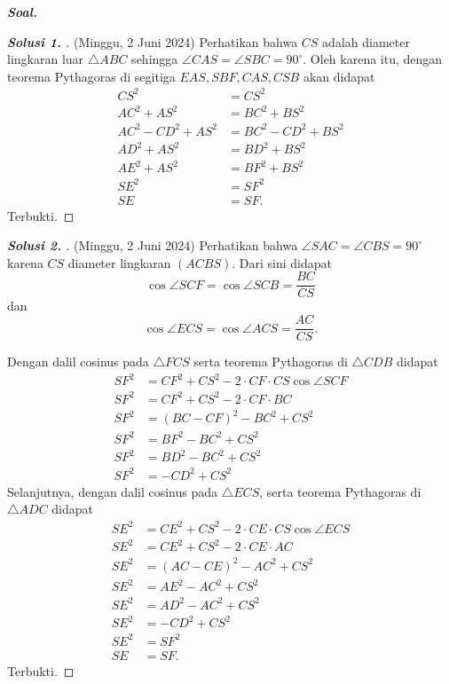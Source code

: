 \textbf{\textit{Soal. }} 
% 

\begin{proof}[\textbf{Solusi 1. }] (Minggu, 2 Juni 2024) 
Perhatikan bahwa $CS$ adalah diameter lingkaran luar $\triangle ABC$ sehingga $\angle CAS = \angle SBC = 90^\circ$. Oleh karena itu, dengan teorema Pythagoras di segitiga $EAS, SBF, CAS, CSB$ akan didapat
\begin{align*}
    CS^2 &= CS^2\\
    AC^2 + AS^2 &= BC^2+BS^2\\
    AC^2 - CD^2 + AS^2 &= BC^2 - CD^2 + BS^2\\
    AD^2 + AS^2 &= BD^2 + BS^2\\
    AE^2 + AS^2 &= BF^2 + BS^2\\
    SE^2 &= SF^2\\
    SE &= SF.
\end{align*}
Terbukti.
\end{proof}

\begin{proof}[\textbf{Solusi 2. }] (Minggu, 2 Juni 2024) 
Perhatikan bahwa $\angle SAC = \angle CBS = 90^\circ$ karena $CS$ diameter lingkaran $(ACBS)$. Dari sini didapat 
$$\cos \angle SCF = \cos \angle SCB = \frac{BC}{CS}$$ 
dan 
$$\cos \angle ECS = \cos \angle ACS = \frac{AC}{CS}.$$

Dengan dalil cosinus pada $\triangle FCS$ serta teorema Pythagoras di $\triangle CDB$ didapat
\begin{align*}
    SF^2 &= CF^2 + CS^2 - 2\cdot CF \cdot CS \cos \angle SCF\\
    SF^2 &= CF^2 + CS^2 - 2\cdot CF \cdot BC\\
    SF^2 &= (BC-CF)^2 - BC^2 + CS^2\\
    SF^2 &= BF^2 - BC^2 + CS^2\\
    SF^2 &= BD^2 - BC^2 + CS^2\\
    SF^2 &= -CD^2 + CS^2
\end{align*}
Selanjutnya, dengan dalil cosinus pada $\triangle ECS$, serta teorema Pythagoras di $\triangle ADC$ didapat
\begin{align*}
    SE^2 &= CE^2 + CS^2 - 2\cdot CE \cdot CS \cos \angle ECS \\
    SE^2 &= CE^2 + CS^2 - 2\cdot CE \cdot AC\\
    SE^2 &= (AC-CE)^2 - AC^2 + CS^2\\
    SE^2 &= AE^2 - AC^2 + CS^2\\
    SE^2 &= AD^2 - AC^2 + CS^2\\
    SE^2 &= -CD^2 + CS^2\\
    SE^2 &= SF^2\\
    SE &= SF.
\end{align*}
Terbukti.
\end{proof}

